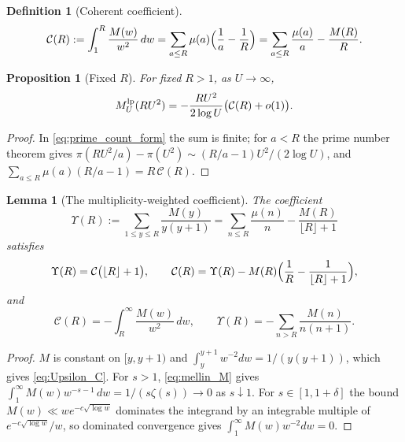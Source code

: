 \documentclass[11pt]{amsart}
\numberwithin{equation}{section}
\theoremstyle{plain}
\newtheorem{proposition}[theorem]{Proposition}
\newtheorem{lemma}[theorem]{Lemma}
\theoremstyle{definition}
\newtheorem{definition}[theorem]{Definition}
\theoremstyle{remark}
\newcommand{\Cc}{\mathcal{C}}
\begin{document}
\begin{definition}[Coherent coefficient]
\label{def:coherent_coefficient}
\begin{equation}
\label{eq:C_def}
  \Cc(R):=\int_1^R\frac{M(w)}{w^2}\,dw
  =\sum_{a\le R}\mu(a)\Bigl(\frac1a-\frac1R\Bigr)
  =\sum_{a\le R}\frac{\mu(a)}a-\frac{M(R)}R .
\end{equation}
\end{definition}

\begin{proposition}[Fixed $R$]
\label{prop:fixed_R_corrected}
For fixed $R>1$, as $U\to\infty$,
\begin{equation}
\label{eq:E_fixed_R}
  M^{\rm lp}_U(RU^2)=-\frac{RU^2}{2\log U}\bigl(\Cc(R)+o(1)\bigr).
\end{equation}
\end{proposition}

\begin{proof}
In \eqref{eq:prime_count_form} the sum is finite; for $a<R$ the prime number
theorem gives $\pi(RU^2/a)-\pi(U^2)\sim(R/a-1)U^2/(2\log U)$, and
$\sum_{a\le R}\mu(a)(R/a-1)=R\,\Cc(R)$.
\end{proof}

\begin{lemma}[The multiplicity-weighted coefficient]
\label{lem:copy-weight-coefficient}
The coefficient
\begin{equation}
\label{eq:Upsilon_def}
  \Upsilon(R):=\sum_{1\le y\le R}\frac{M(y)}{y(y+1)}
  =\sum_{n\le R}\frac{\mu(n)}n-\frac{M(R)}{\lfloor R\rfloor+1}
\end{equation}
satisfies
\begin{equation}
\label{eq:Upsilon_C}
  \Upsilon(R)=\Cc\bigl(\lfloor R\rfloor+1\bigr),\qquad
  \Cc(R)=\Upsilon(R)-M(R)\Bigl(\frac1R-\frac1{\lfloor R\rfloor+1}\Bigr),
\end{equation}
and
\begin{equation}
\label{eq:C_tail}
  \Cc(R)=-\int_R^\infty\frac{M(w)}{w^2}\,dw,\qquad
  \Upsilon(R)=-\sum_{n>R}\frac{M(n)}{n(n+1)}.
\end{equation}
\end{lemma}

\begin{proof}
$M$ is constant on $[y,y+1)$ and $\int_y^{y+1}w^{-2}dw=1/(y(y+1))$, which
gives \eqref{eq:Upsilon_C}. For $s>1$, \eqref{eq:mellin_M} gives
$\int_1^\infty M(w)w^{-s-1}\,dw=1/(s\zeta(s))\to0$ as $s\downarrow1$. For
$s\in[1,1+\delta]$ the bound $M(w)\ll we^{-c\sqrt{\log w}}$ dominates the
integrand by an integrable multiple of $e^{-c\sqrt{\log w}}/w$, so dominated
convergence gives $\int_1^\infty M(w)w^{-2}dw=0$.
\end{proof}
\end{document}
